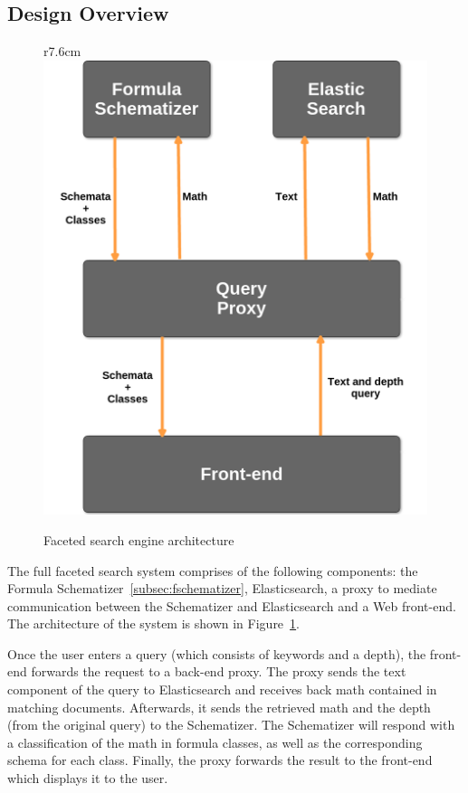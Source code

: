 \documentclass[a4paper,oneside]{article}
\begin{document}
\subsection{Design Overview}\label{subsec:design_overview}
\begin{figure}r{7.6cm}\vspace*{-1em}
    \includegraphics[scale=0.3]{img/SchemaArchitecture.png}
    \caption{Faceted search engine architecture}\label{fig:sys_architecture}
\end{figure}

The full faceted search system comprises of the following components: the
Formula Schematizer~\ref{subsec:fschematizer}, Elasticsearch, a proxy to
mediate communication between the Schematizer and Elasticsearch and a Web
front-end. The architecture of the system is shown in
Figure~\ref{fig:sys_architecture}. 

Once the user enters a query (which consists of keywords and a depth), the
front-end forwards the request to a back-end proxy. The proxy sends the
text component of the query to Elasticsearch and receives back math
contained in matching documents. Afterwards, it sends the retrieved math
and the depth (from the original query) to the Schematizer. The Schematizer
will respond with a classification of the math in formula classes, as well
as the corresponding schema for each class. Finally, the proxy forwards the
result to the front-end which displays it to the user.
\end{document}
